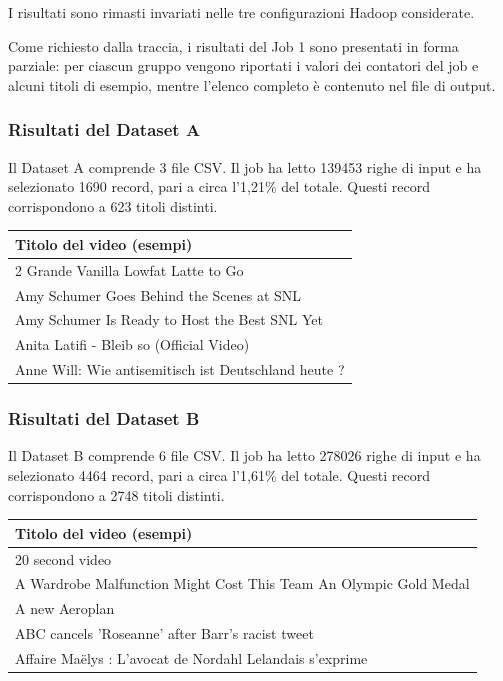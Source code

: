 \documentclass[12pt, a4paper]{article}
\begin{document}
I risultati sono rimasti invariati nelle
tre configurazioni Hadoop considerate.

Come richiesto dalla traccia, i risultati
del Job 1 sono presentati in forma parziale:
per ciascun gruppo vengono riportati
i valori dei contatori del job e alcuni
titoli di esempio, mentre l'elenco completo
è contenuto nel file di output.

\subsubsection{Risultati del Dataset A}

Il Dataset A comprende 3 file CSV.
Il job ha letto 139453 righe di input e ha selezionato 1690 record,
pari a circa l'1,21\% del totale.
Questi record corrispondono a 623 titoli distinti.

\begin{center}
\small
\begin{tabular}{|p{}|}
\hline
\textbf{Titolo del video (esempi)} \\
\hline
2 Grande Vanilla Lowfat Latte to Go \\
Amy Schumer Goes Behind the Scenes at SNL \\
Amy Schumer Is Ready to Host the Best SNL Yet \\
Anita Latifi - Bleib so (Official Video) \\
Anne Will: Wie antisemitisch ist Deutschland heute ? \\
\hline
\end{tabular}
\end{center}

\subsubsection{Risultati del Dataset B}

Il Dataset B comprende 6 file CSV.
Il job ha letto 278026 righe di input e ha selezionato 4464 record,
pari a circa l'1,61\% del totale.
Questi record corrispondono a 2748 titoli distinti.

\begin{center}
\small
\begin{tabular}{|p{}|}
\hline
\textbf{Titolo del video (esempi)} \\
\hline
20 second video \\
A Wardrobe Malfunction Might Cost This Team An Olympic Gold Medal \\
A new Aeroplan \\
ABC cancels 'Roseanne' after Barr's racist tweet \\
Affaire Maëlys : L'avocat de Nordahl Lelandais s'exprime \\
\hline
\end{tabular}
\end{center}
\end{document}
